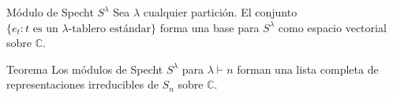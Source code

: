 \documentclass[final,xcolor=svgnames]{beamer}
\DeclareMathOperator{\sgn}{sgn}
\begin{document}
\begin{frame}{}
\begin{columns}
\begin{column}{0.5\textwidth}
      \begin{block}{Módulo de Specht $S^{\lambda}$}
        Sea $\lambda$ cualquier partición. El conjunto $\{e_{t}:t
        \mbox{ es un }\lambda\mbox{-tablero estándar}\}$
        forma una base para $S^{\lambda}$ como espacio vectorial
        sobre $\mathbb{C}$.
      \end{block} 

       \begin{block}{Teorema}
       Los módulos de Specht $S^{\lambda}$ para $\lambda\vdash n$ forman
       una lista completa de representaciones irreducibles de $S_{n}$ sobre $\mathbb{C}$.
     \end{block}
    \end{column}

    \begin{column}{0.5\textwidth}
      
        
        

\end{column}
\end{columns}
\end{frame}
\end{document}
